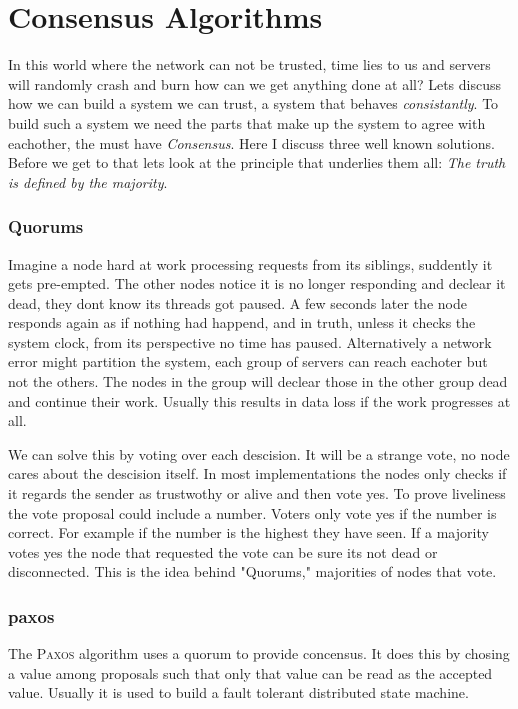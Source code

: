 \section{Consensus Algorithms}
In this world where the network can not be trusted, time lies to us and servers will randomly crash and burn how can we get anything done at all? Lets discuss how we can build a system we can trust, a system that behaves \textit{consistantly}. To build such a system we need the parts that make up the system to agree with eachother, the must have \emph{Consensus}. Here I discuss three well known solutions. Before we get to that lets look at the principle that underlies them all: \emph{The truth is defined by the majority}.

\subsubsection*{Quorums}
Imagine a node hard at work processing requests from its siblings, suddently it gets pre-empted. The other nodes notice it is no longer responding and declear it dead, they dont know its threads got paused. A few seconds later the node responds again as if nothing had happend, and in truth, unless it checks the system clock, from its perspective no time has paused. Alternatively a network error might partition the system, each group of servers can reach eachoter but not the others. The nodes in the group will declear those in the other group dead and continue their work. Usually this results in data loss if the work progresses at all.

We can solve this by voting over each descision. It will be a strange vote, no node cares about the descision itself. In most implementations the nodes only checks if it regards the sender as trustwothy or alive and then vote yes. To prove liveliness the vote proposal could include a number. Voters only vote yes if the number is correct. For example if the number is the highest they have seen. If a majority votes yes the node that requested the vote can be sure its not dead or disconnected. This is the idea behind "Quorums," majorities of nodes that vote.

\subsubsection*{paxos}
The \textsc{Paxos} algorithm\cite{paxos} uses a quorum to provide concensus. It does this by chosing a value among proposals such that only that value can be read as the accepted value. Usually it is used to build a fault tolerant distributed state machine. 

